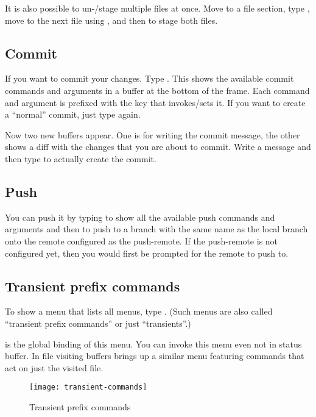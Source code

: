 It is also possible to un-/stage multiple files at once.
Move to a file section, type , move to the next file using , and then  to stage both files.

\subsection{Commit}
\label{sec:commit}

If you want to commit your changes.
Type .
This shows the available commit commands and arguments in a buffer at the bottom of the frame.
Each command and argument is prefixed with the key that invokes/sets it.
If you want to create a ``normal'' commit, just type  again.


Now two new buffers appear.
One is for writing the commit message, the other shows a diff with the changes that you are about to commit.
Write a message and then type  to actually create the commit.

\subsection{Push}
\label{sec:push}

You can push it by typing  to show all the available push commands and arguments and then  to push to a branch with the same name as the local branch onto the remote configured as the push-remote.
If the push-remote is not configured yet, then you would first be prompted for the remote to push to.


\subsection{Transient prefix commands}
\label{sec:help}

To show a menu that lists all menus, type .
(Such menus are also called ``transient prefix commands'' or just ``transients''.)

 is the global binding of this menu.
You can invoke this menu even not in status buffer.
In file visiting buffers  brings up a similar menu featuring commands that act on just the visited file.

\begin{figure}[!htbp]
  \centering
  \texttt{[image: transient-commands]}
  \caption{Transient prefix commands}
  \label{fig:transient-commands}
\end{figure}

